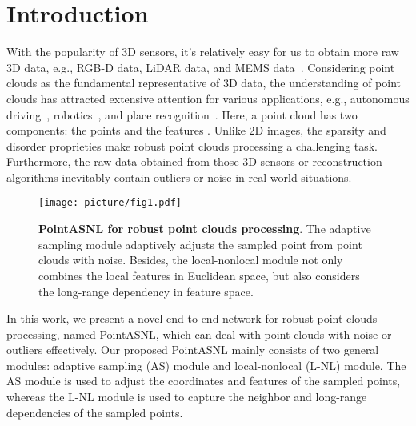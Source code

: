 \documentclass[10pt,twocolumn,letterpaper]{article}
\begin{document}
	\vspace{-0.3cm}
\section{Introduction}
	


	With the popularity of 3D sensors, it's relatively easy for us to obtain more raw 3D data, e.g., RGB-D data, LiDAR data, and MEMS data~\cite{PointConv}. Considering point clouds as the fundamental representative of 3D data, the understanding of point clouds has attracted extensive attention for various applications, e.g., autonomous driving~\cite{shi2019pointrcnn}, robotics~\cite{wang2015voting}, and place recognition~\cite{liu2019lpd}.  Here, a point cloud has two components: the points  and the features . Unlike 2D images, the sparsity and disorder proprieties make robust point clouds processing a challenging task. Furthermore, the raw data obtained from those 3D sensors or reconstruction algorithms inevitably contain outliers or noise in real-world situations.
	
	


	\begin{figure}[t]
		\begin{center}
			\texttt{[image: picture/fig1.pdf]}
		\end{center}
		\caption{{\bf PointASNL for robust point clouds processing}. The adaptive sampling module adaptively adjusts the sampled point from point clouds with noise. Besides, the local-nonlocal module not only combines the local features in Euclidean space, but also considers the long-range dependency in feature space.}
		\label{fig:fig1}
		\vspace{-0.5cm}
	\end{figure}
	
	In this work, we present a novel end-to-end network for robust point clouds processing, named PointASNL, which can deal with point clouds with noise or outliers effectively. Our proposed PointASNL mainly consists of two general modules: adaptive sampling (AS) module and local-nonlocal (L-NL) module. The AS module is used to adjust the coordinates and features of the sampled points, whereas the L-NL module is used to capture the neighbor and long-range dependencies of the sampled points.
	
\end{document}
